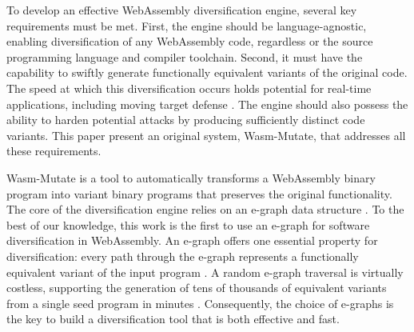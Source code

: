 \documentclass[a4paper,fleqn]{cas-dc}
\newcommand*\badge[1]{ \colorbox{red}{\color{white}#1}}
\newcommand{\tool}{{\sc Wasm-Mutate}\xspace}
\newcommand{\Wasm}{WebAssembly\xspace}
\newcommand{\wasm}{\Wasm}
\newcommand{\todo}[1]{%
\refstepcounter{todo}
\noindent\textbf{\badge{TODO}} {\color{red}#1}
\addcontentsline{td}{todo}
{\color{red}\thesection.\thetodo\xspace #1}}
\begin{document}
To develop an effective \wasm diversification engine, several key requirements must be met. 
First, the engine should be language-agnostic, enabling diversification of any \Wasm code, regardless or the source programming language and compiler toolchain.
Second, it must have the capability to swiftly generate functionally equivalent variants of the original code. 
The speed at which this diversification occurs holds potential for real-time applications, including  moving target defense \cite{MEWE}. 
The engine should also possess the ability to harden potential attacks by producing sufficiently distinct code variants.
This paper present an original system, \tool, that addresses all these requirements.

\tool is a tool to automatically transforms a \wasm binary program into variant binary programs that preserves the original functionality. 
The core of the diversification engine relies on an e-graph data structure \cite{10.1145/3434304}.
To the best of our knowledge, this work is the first to use an e-graph  for software diversification in \Wasm. An e-graph offers one essential property for diversification:  every path through the e-graph represents a functionally equivalent variant of the input program \cite{10.1145/3434304, 10.1145/3385412.3386001}.  
A random e-graph traversal is virtually costless, supporting the generation of tens of thousands of equivalent variants from a single seed program in minutes \cite{10.1145/3547622}. 
Consequently, the choice of e-graphs is the key to build a diversification tool that is both effective and fast.
\end{document}
